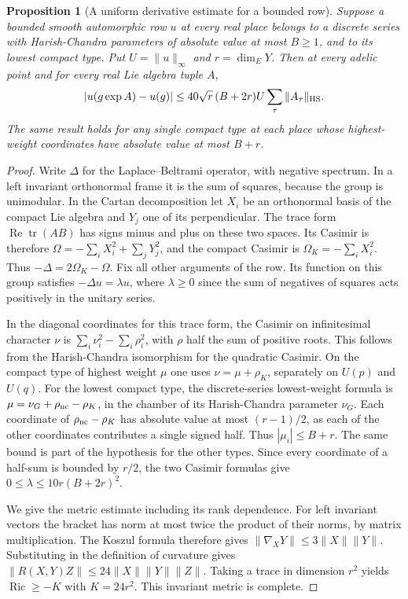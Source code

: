 \documentclass[a4paper,11pt]{article}
\newtheorem{proposition}{Proposition}[section]
\theoremstyle{definition}
\theoremstyle{remark}
\numberwithin{equation}{section}
\begin{document}
\begin{proposition}[A uniform derivative estimate for a bounded row]
\label{prop:gradient248}
Suppose a bounded smooth automorphic row \(u\) at every real place
belongs to a discrete series with Harish-Chandra parameters of
absolute value at most \(B\ge1\), and to its lowest compact type.
Put \(U=\|u\|_\infty\) and \(r=\dim_E Y\). Then at every adelic point
and for every real Lie algebra tuple \(A\),
\[
  |u(g\exp A)-u(g)|
       \le 40\sqrt r\,(B+2r) U\sum_\tau\|A_\tau\|_{\rm HS} .
\]
The same result holds for any single compact type at each place
whose highest-weight coordinates have absolute value at most \(B+r\).
\end{proposition}
\begin{proof}
Write \(\Delta\) for the Laplace--Beltrami operator, with negative
spectrum. In a left invariant orthonormal frame it is the sum of
squares, because the group is unimodular. In the Cartan decomposition
let \(X_i\) be an orthonormal basis of the compact Lie algebra and
\(Y_j\) one of its perpendicular. The trace form
\(\operatorname{Re}\operatorname{tr}(AB)\) has signs minus and plus
on these two spaces. Its Casimir is therefore
\(\Omega=-\sum_i X_i^2+\sum_jY_j^2\), and the compact Casimir is
\(\Omega_K=-\sum_iX_i^2\). Thus \(-\Delta=2\Omega_K-\Omega\).
Fix all other arguments of the row. Its function on this group
satisfies \(-\Delta u=\lambda u\), where \(\lambda\ge0\) since the
sum of negatives of squares acts positively in the unitary series.

In the diagonal coordinates for this trace form, the Casimir on
infinitesimal character \(\nu\) is
\(\sum_i\nu_i^2-\sum_i\rho_i^2\), with \(\rho\) half the sum of
positive roots. This follows from the Harish-Chandra isomorphism for
the quadratic Casimir. On the compact type of highest weight \(\mu\)
one uses \(\nu=\mu+\rho_K\), separately on \(U(p)\) and \(U(q)\).
For the lowest compact type, the discrete-series lowest-weight
formula is \(\mu=\nu_G+\rho_{\rm nc}-\rho_K\), in the chamber of
its Harish-Chandra parameter \(\nu_G\). Each coordinate of
\(\rho_{\rm nc}-\rho_K\) has absolute value at most \((r-1)/2\),
as each of the other coordinates contributes a single signed half.
Thus \(|\mu_i|\le B+r\). The same bound is part of the hypothesis
for the other types. Since every coordinate of a half-sum is bounded
by \(r/2\), the two Casimir formulas give
\(0\le\lambda\le 10r(B+2r)^2\).

We give the metric estimate including its rank dependence. For
left invariant vectors the bracket has norm at most twice the
product of their norms, by matrix multiplication. The Koszul
formula therefore gives \(\|\nabla_XY\|\le3\|X\|\|Y\|\). Substituting
in the definition of curvature gives
\(\|R(X,Y)Z\|\le24\|X\|\|Y\|\|Z\|\). Taking a trace in dimension
\(r^2\) yields \(\operatorname{Ric}\ge-K\) with \(K=24r^2\).
This invariant metric is complete.


\end{proof}
\end{document}

